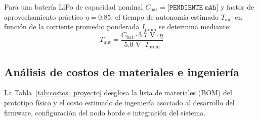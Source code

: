 \documentclass[12pt, letterpaper]{article}
\begin{document}
Para una batería LiPo de capacidad nominal $C_{\text{bat}} = \texttt{[PENDIENTE mAh]}$ y factor de aprovechamiento práctico $\eta = 0.85$, el tiempo de autonomía estimado $T_{\text{aut}}$ en función de la corriente promedio ponderada $I_{\text{prom}}$ se determina mediante:
\begin{equation}
    T_{\text{aut}} = \frac{C_{\text{bat}} \cdot 3.7\text{ V} \cdot \eta}{5.0\text{ V} \cdot I_{\text{prom}}}
\end{equation}

\subsection*{Análisis de costos de materiales e ingeniería}
La Tabla~\ref{tab:costos_proyecto} desglosa la lista de materiales (BOM) del prototipo físico y el costo estimado de ingeniería asociado al desarrollo del firmware, configuración del nodo borde e integración del sistema.
\end{document}
